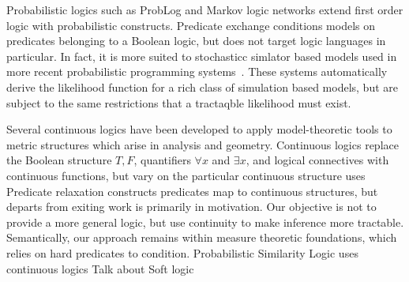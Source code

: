 Probabilistic logics such as ProbLog \cite{richardson2006markov} and Markov logic networks \cite{de2007problog} extend first order logic with probabilistic constructs.
Predicate exchange conditions models on predicates belonging to a Boolean logic, but does not target logic languages in particular.
In fact, it is more suited to stochasticc simlator based models used in more recent probabilistic programming systems~\citep{milch20071, wood2014new,mansinghka2014venture,goodman2008church,carpenter2017stan}.  These systems automatically derive the likelihood function for a rich class of simulation based models, but are subject to the same restrictions that a tractaqble likelihood must exist.


Several continuous logics have been developed to apply model-theoretic tools to metric structures which arise in analysis and geometry.
Continuous logics replace the Boolean structure ${T, F}$, quantifiers $\forall x$ and $\exists x$, and logical connectives with continuous functions,
but vary on the particular continuous structure uses
Predicate relaxation constructs predicates map to continuous structures, but departs from exiting work is primarily in motivation.
Our objective is not to provide a more general logic, but use continuity to make inference more tractable.
Semantically, our approach remains within measure theoretic foundations, which relies on hard predicates to condition.
Probabilistic Similarity Logic \cite{brocheler2012probabilistic,kimmig2012short} uses continuous logics 
Talk about Soft logic



